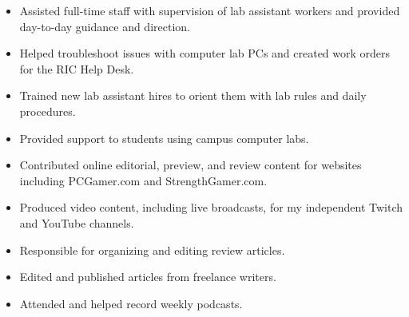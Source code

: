 \documentclass[
  letterpaper, 
   topbottommargin=0.03\paperheight,
   leftrightmargin=20pt,
]{fortysecondscv}
\begin{document}
\vspace{-1em}
\begin{cvtable}%
	    {
	    \vspace{-2em}
	    \begin{itemize}[noitemsep]
	        \item Assisted full-time staff with supervision of lab assistant workers and provided day-to-day guidance and direction.
	        \item Helped troubleshoot issues with computer lab PCs and created work orders for the RIC Help Desk.
	        \item Trained new lab assistant hires to orient them with lab rules and daily procedures.
	    \end{itemize}
	    }
	    {
	    \vspace{-2em}
	    \begin{itemize}[noitemsep]
	        \item Provided support to students using campus computer labs.
	    \end{itemize}
	    }
	    {
	    \vspace{-2em}
	    \begin{itemize}[noitemsep]
	        \item Contributed online editorial, preview, and review content for websites including PCGamer.com and StrengthGamer.com.
	        \item Produced video content, including live broadcasts, for my independent Twitch and YouTube channels.
	    \end{itemize}
	    }
	    {
	    \vspace{-2em}
	    \begin{itemize}[noitemsep]
	        \item Responsible for organizing and editing review articles.
	        \item Edited and published articles from freelance writers.
	        \item Attended and helped record weekly podcasts.

\end{itemize}}
\end{cvtable}
\end{document}
